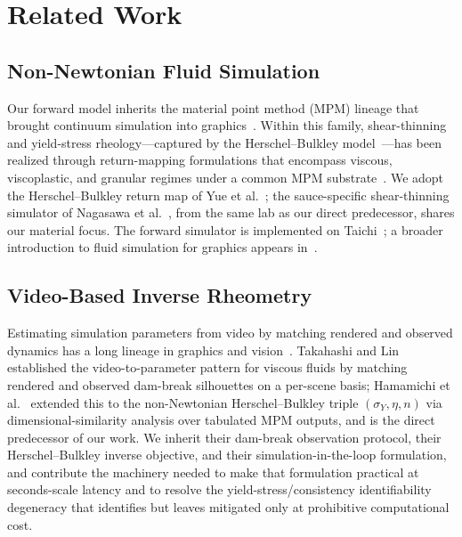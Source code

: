 \section{Related Work}

\subsection{Non-Newtonian Fluid Simulation}

Our forward model inherits the material point method (MPM) lineage that
brought continuum simulation into graphics~\cite{stomakhin2013material,
jiang2015affine,hu2018moving,jiang2016material}. Within this family,
shear-thinning and yield-stress rheology---captured by the
Herschel--Bulkley model~\cite{herschel1926konsistenzmessungen}---has been
realized through return-mapping formulations that encompass viscous,
viscoplastic, and granular regimes under a common MPM
substrate~\cite{yue2015continuum,ram2015material,klar2016drucker,
tampubolon2017multi,wolper2019cdmpm}. We adopt the Herschel--Bulkley
return map of Yue et al.~\cite{yue2015continuum}; the sauce-specific
shear-thinning simulator of Nagasawa et al.~\cite{nagasawa2019mixing},
from the same lab as our direct predecessor, shares our material focus.
The forward simulator is implemented on Taichi~\cite{hu2019taichi}; a
broader introduction to fluid simulation for graphics
appears in~\cite{bridson2015fluid}.


\subsection{Video-Based Inverse Rheometry}

Estimating simulation parameters from video by matching rendered and
observed dynamics has a long lineage in graphics and
vision~\cite{bhat2002computing,monszpart2016smash}. Takahashi and
Lin~\cite{takahashi2019video} established the video-to-parameter pattern
for viscous fluids by matching rendered and observed dam-break
silhouettes on a per-scene basis; Hamamichi et
al.~\cite{hamamichi2023nonnewtonian} extended this to the non-Newtonian
Herschel--Bulkley triple $(\sigma_Y, \eta, n)$ via dimensional-similarity
analysis over tabulated MPM outputs, and is the direct predecessor of
our work. We inherit their dam-break observation protocol, their
Herschel--Bulkley inverse objective, and their simulation-in-the-loop
formulation, and contribute the machinery needed to make that
formulation practical at seconds-scale latency and to resolve the
yield-stress/consistency identifiability degeneracy that
\cite{hamamichi2023nonnewtonian} identifies but leaves mitigated only at
prohibitive computational cost.

